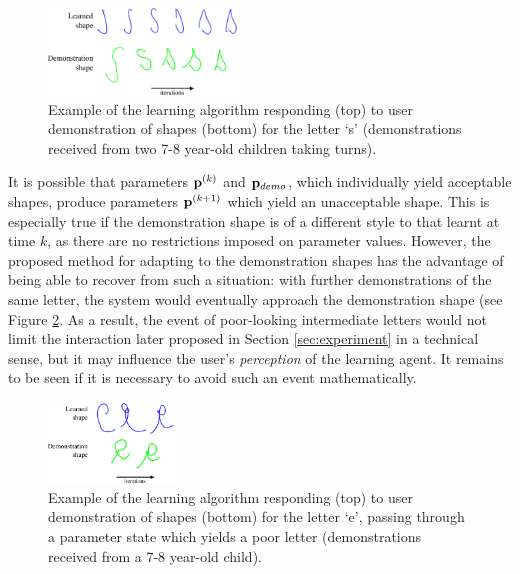 \documentclass{sig-alternate}
\begin{document}
\begin{figure}[thpb]
    \centering
    \includegraphics[width=0.45\textwidth]{figures/learningSdemo}
    \caption{\label{fig:demonstrationShapes2}Example of the learning algorithm
    responding (top) to user demonstration of shapes (bottom) for the letter `s' (demonstrations received from two 7-8 year-old children taking turns).}
\end{figure}

It is possible that parameters ${\bf p}^{(k)}$ and ${\bf p}_{demo}$, which
individually yield acceptable shapes, produce parameters ${\bf p}^{(k+1)}$
which yield an unacceptable shape. This is especially true if the demonstration
shape is of a different style to that learnt at time $k$, as there are no
restrictions imposed on parameter values. However, the proposed method for adapting to
the demonstration shapes has the advantage of being able to recover from such a situation: with further
demonstrations of the same letter, the system would eventually approach the
demonstration shape (see Figure \ref{fig:eDemo}. As a result, the event of poor-looking 
intermediate letters
would not limit the interaction later proposed in Section \ref{sec:experiment}
in a technical sense, but it may influence the user's \emph{perception} of the learning
agent. It remains to be seen if it is necessary to avoid such an event
mathematically.

\begin{figure}[thpb]
    \centering
    \includegraphics[width=0.3\textwidth]{figures/learningEdemo}
    \caption{\label{fig:eDemo}Example of the learning algorithm
    responding (top) to user demonstration of shapes (bottom) for the letter `e', passing through a parameter state which yields a poor letter (demonstrations received from a 7-8 year-old child).}
\end{figure}



\end{document}

